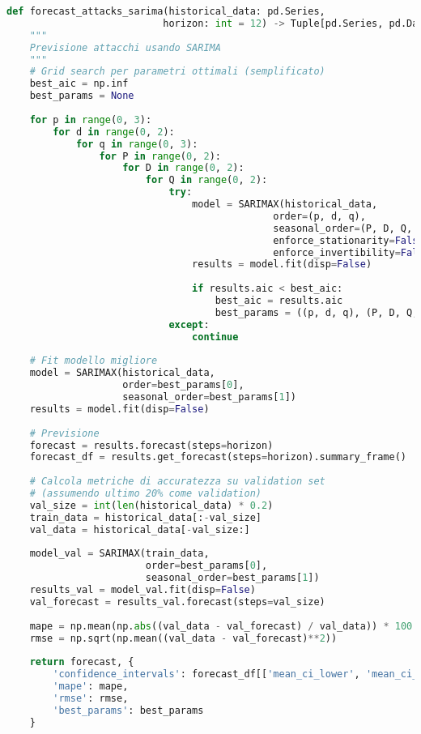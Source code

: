 \begin{lstlisting}[language=Python, caption=Decomposizione Stagionale Pattern Attacchi]
def forecast_attacks_sarima(historical_data: pd.Series, 
                           horizon: int = 12) -> Tuple[pd.Series, pd.DataFrame]:
    """
    Previsione attacchi usando SARIMA
    """
    # Grid search per parametri ottimali (semplificato)
    best_aic = np.inf
    best_params = None
    
    for p in range(0, 3):
        for d in range(0, 2):
            for q in range(0, 3):
                for P in range(0, 2):
                    for D in range(0, 2):
                        for Q in range(0, 2):
                            try:
                                model = SARIMAX(historical_data,
                                              order=(p, d, q),
                                              seasonal_order=(P, D, Q, 52),
                                              enforce_stationarity=False,
                                              enforce_invertibility=False)
                                results = model.fit(disp=False)
                                
                                if results.aic < best_aic:
                                    best_aic = results.aic
                                    best_params = ((p, d, q), (P, D, Q, 52))
                            except:
                                continue
    
    # Fit modello migliore
    model = SARIMAX(historical_data,
                    order=best_params[0],
                    seasonal_order=best_params[1])
    results = model.fit(disp=False)
    
    # Previsione
    forecast = results.forecast(steps=horizon)
    forecast_df = results.get_forecast(steps=horizon).summary_frame()
    
    # Calcola metriche di accuratezza su validation set
    # (assumendo ultimo 20% come validation)
    val_size = int(len(historical_data) * 0.2)
    train_data = historical_data[:-val_size]
    val_data = historical_data[-val_size:]
    
    model_val = SARIMAX(train_data,
                        order=best_params[0],
                        seasonal_order=best_params[1])
    results_val = model_val.fit(disp=False)
    val_forecast = results_val.forecast(steps=val_size)
    
    mape = np.mean(np.abs((val_data - val_forecast) / val_data)) * 100
    rmse = np.sqrt(np.mean((val_data - val_forecast)**2))
    
    return forecast, {
        'confidence_intervals': forecast_df[['mean_ci_lower', 'mean_ci_upper']],
        'mape': mape,
        'rmse': rmse,
        'best_params': best_params
    }
\end{lstlisting}

